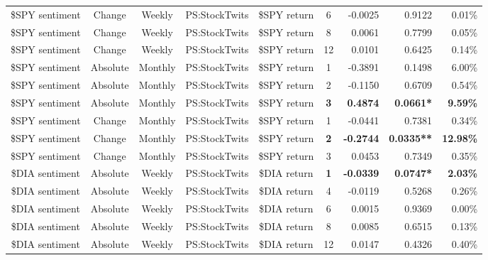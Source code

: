 \begin{longtable}{ccccccrrrrr}
    \$SPY sentiment & Change & Weekly & PS:StockTwits & \$SPY return & 6     & -0.0025 & \multicolumn{2}{r}{0.9122} & \multicolumn{2}{r}{0.01\%} \\
    \$SPY sentiment & Change & Weekly & PS:StockTwits & \$SPY return & 8     & 0.0061 & \multicolumn{2}{r}{0.7799} & \multicolumn{2}{r}{0.05\%} \\
    \$SPY sentiment & Change & Weekly & PS:StockTwits & \$SPY return & 12    & 0.0101 & \multicolumn{2}{r}{0.6425} & \multicolumn{2}{r}{0.14\%} \\
    \$SPY sentiment & Absolute & Monthly & PS:StockTwits & \$SPY return & 1     & -0.3891 & \multicolumn{2}{r}{0.1498} & \multicolumn{2}{r}{6.00\%} \\
    \$SPY sentiment & Absolute & Monthly & PS:StockTwits & \$SPY return & 2     & -0.1150 & \multicolumn{2}{r}{0.6709} & \multicolumn{2}{r}{0.54\%} \\
    \$SPY sentiment & Absolute & Monthly & PS:StockTwits & \$SPY return & \textbf{3} & \textbf{0.4874} & \multicolumn{2}{r}{\textbf{0.0661*}} & \multicolumn{2}{r}{\textbf{9.59\%}} \\
    \$SPY sentiment & Change & Monthly & PS:StockTwits & \$SPY return & 1     & -0.0441 & \multicolumn{2}{r}{0.7381} & \multicolumn{2}{r}{0.34\%} \\
    \$SPY sentiment & Change & Monthly & PS:StockTwits & \$SPY return & \textbf{2} & \textbf{-0.2744} & \multicolumn{2}{r}{\textbf{0.0335**}} & \multicolumn{2}{r}{\textbf{12.98\%}} \\
    \$SPY sentiment & Change & Monthly & PS:StockTwits & \$SPY return & 3     & 0.0453 & \multicolumn{2}{r}{0.7349} & \multicolumn{2}{r}{0.35\%} \\
    \$DIA sentiment & Absolute & Weekly & PS:StockTwits & \$DIA return & \textbf{1} & \textbf{-0.0339} & \multicolumn{2}{r}{\textbf{0.0747*}} & \multicolumn{2}{r}{\textbf{2.03\%}} \\
    \$DIA sentiment & Absolute & Weekly & PS:StockTwits & \$DIA return & 4     & -0.0119 & \multicolumn{2}{r}{0.5268} & \multicolumn{2}{r}{0.26\%} \\
    \$DIA sentiment & Absolute & Weekly & PS:StockTwits & \$DIA return & 6     & 0.0015 & \multicolumn{2}{r}{0.9369} & \multicolumn{2}{r}{0.00\%} \\
    \$DIA sentiment & Absolute & Weekly & PS:StockTwits & \$DIA return & 8     & 0.0085 & \multicolumn{2}{r}{0.6515} & \multicolumn{2}{r}{0.13\%} \\
    \$DIA sentiment & Absolute & Weekly & PS:StockTwits & \$DIA return & 12    & 0.0147 & \multicolumn{2}{r}{0.4326} & \multicolumn{2}{r}{0.40\%} \\

\end{longtable}
